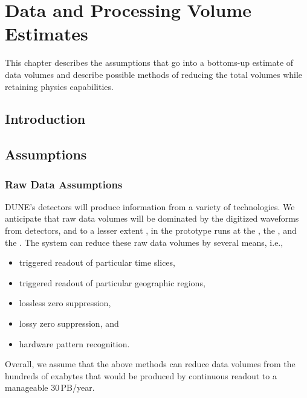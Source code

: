 \documentclass[../main-v1.tex]{subfiles}
\begin{document}
\chapter{Data and Processing Volume Estimates }
\label{ch:est}
This chapter describes the assumptions that go into a bottoms-up estimate of data volumes and describe possible methods of reducing the total volumes while retaining physics capabilities. 

\section{Introduction }


\section{Assumptions }
\label{sec:est:assume}  %

\subsection{Raw Data Assumptions }
DUNE's detectors will produce information from a variety of technologies.  We anticipate that raw data volumes will be dominated by the digitized waveforms from  detectors, and to a lesser extent , in the prototype runs at the , the , and the .  
The  system can reduce these raw data volumes by several means, i.e.,
\begin{itemize} 
\item triggered readout of particular time slices,
\item triggered readout of particular geographic regions,
\item lossless zero suppression,
\item lossy zero suppression, and
\item hardware pattern recognition.
\end{itemize}

Overall, we assume that the above methods can reduce data volumes from the hundreds of exabytes that would be produced by continuous readout to a manageable 30\,PB/year. 
\end{document}
